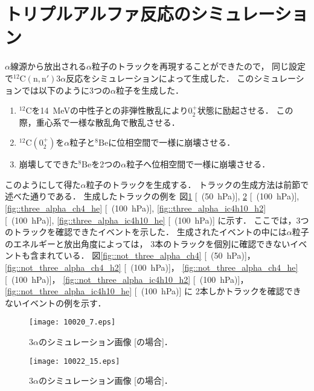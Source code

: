 \documentclass[../master]{subfiles}
\begin{document}
\section{トリプルアルファ反応のシミュレーション}
\label{sec::triple_alpha_simulation}
$\alpha$線源から放出される$\alpha$粒子のトラックを再現することができたので，
同じ設定で${}^{12}{\mathrm{C}}({\mathrm{n}},{\mathrm{n}}')3\alpha$反応をシミュレーションによって生成した．
このシミュレーションでは以下のように3つの$\alpha$粒子を生成した．
\begin{enumerate}
\item
  ${}^{12}\mathrm{C}$を\SI{14}{\mega\electronvolt}の中性子との非弾性散乱により$0_2^+$状態に励起させる．
  この際，重心系で一様な散乱角で散乱させる．
\item
  ${}^{12}\mathrm{C} (0_2^+)$を$\alpha$粒子と${}^{8}\mathrm{Be}$に位相空間で一様に崩壊させる．
\item
  崩壊してできた${}^{8}\mathrm{Be}$を2つの$\alpha$粒子へ位相空間で一様に崩壊させる．
\end{enumerate}
このようにして得た$\alpha$粒子のトラックを生成する．
トラックの生成方法は前節で述べた通りである．
生成したトラックの例を
図\ref{fig::three_alpha_ch4} [\Methane~(\SI{50}{\hecto\pascal})],
\ref{fig::three_alpha_ch4_h2} [\Methane~(\SI{100}{\hecto\pascal})],
\ref{fig::three_alpha_ch4_he} [\Methane~(\SI{100}{\hecto\pascal})],
\ref{fig::three_alpha_ic4h10_h2} [\isoButaneHydro~(\SI{100}{\hecto\pascal})],
\ref{fig::three_alpha_ic4h10_he} [\isoButaneHerium~(\SI{100}{\hecto\pascal})] に示す．
ここでは，3つのトラックを確認できたイベントを示した．
生成されたイベントの中には$\alpha$粒子のエネルギーと放出角度によっては，
3本のトラックを個別に確認できないイベントも含まれている．
図\ref{fig::not_three_alpha_ch4} [\Methane~(\SI{50}{\hecto\pascal})]，
\ref{fig::not_three_alpha_ch4_h2} [\MethaneHydro~(\SI{100}{\hecto\pascal})]，
\ref{fig::not_three_alpha_ch4_he} [\MethaneHerium~(\SI{100}{\hecto\pascal})]，
\ref{fig::not_three_alpha_ic4h10_h2} [\isoButaneHydro~(\SI{100}{\hecto\pascal})]，
\ref{fig::not_three_alpha_ic4h10_he} [\isoButaneHerium~(\SI{100}{\hecto\pascal})] に
2本しかトラックを確認できないイベントの例を示す．

\begin{figure}
  \centering
  \texttt{[image: 10020\_7.eps]}
  \caption{3$\alpha$のシミュレーション画像 [\Methane の場合]．}
  \label{fig::three_alpha_ch4}
\end{figure}

\begin{figure}
  \centering
  \texttt{[image: 10022\_15.eps]}
  \caption{3$\alpha$のシミュレーション画像 [\MethaneHydro の場合]．}
  \label{fig::three_alpha_ch4_h2}
\end{figure}
\end{document}
